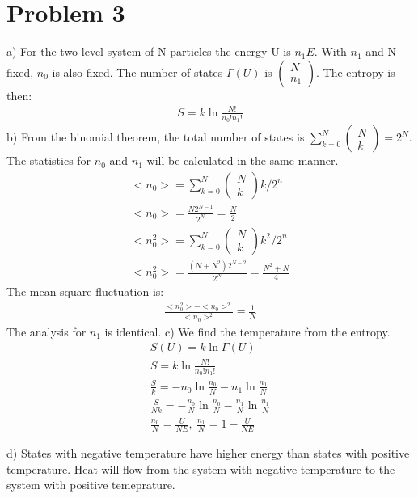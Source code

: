 \documentclass[a4paper,12pt]{article}
\numberwithin{equation}{section}
\begin{document}
\section{Problem 3}
a) For the two-level system of N particles the energy U is $n_1E$. 
With $n_1$ and N fixed, $n_0$ is also fixed.
The number of states $\Gamma(U)$ is $\left(\substack{N\\n_1}\right)$.
The entropy is then:
\begin{gather}
 S=k\ln{\frac{N!}{n_0!n_1!}}
\end{gather}
b) From the binomial theorem, the total number of states is $\sum_{k=0}^N \left(\substack{N\\k}\right)=2^N$.
The statistics for $n_0$ and $n_1$ will be calculated in the same manner.
\begin{gather}
 <n_0>=\sum_{k=0}^N \left(\substack{N\\k}\right)k / 2^n\\
 <n_0>=\frac{N2^{N-1}}{2^N}=\frac{N}{2}\\
 <n_0^2>=\sum_{k=0}^N \left(\substack{N\\k}\right)k^2 / 2^n\\
 <n_0^2>=\frac{(N+N^2)2^{N-2}}{2^N}=\frac{N^2+N}{4}
\end{gather}
The mean square fluctuation is:
\begin{gather}
 \frac{<n_0^2>-<n_0>^2}{<n_0>^2}=\frac{1}{N}
\end{gather}
The analysis for $n_1$ is identical.
c) We find the temperature from the entropy.
\begin{gather}
 S(U)=k\ln{\Gamma(U)}\\
 S=k\ln{\frac{N!}{n_0!n_1!}}\\
 \frac{S}{k}=-n_0\ln{\frac{n_0}{N}}-n_1\ln{\frac{n_1}{N}}\\
 \frac{S}{Nk}=-\frac{n_0}{N}\ln{\frac{n_0}{N}}-\frac{n_1}{N}\ln{\frac{n_1}{N}}\\
 \frac{n_0}{N}=\frac{U}{NE},\ \frac{n_1}{N}=1-\frac{U}{NE}
\end{gather}

d) States with negative temperature have higher energy than states with positive temperature. 
Heat will flow from the system with negative temperature to the system with positive temeprature.
\end{document}
